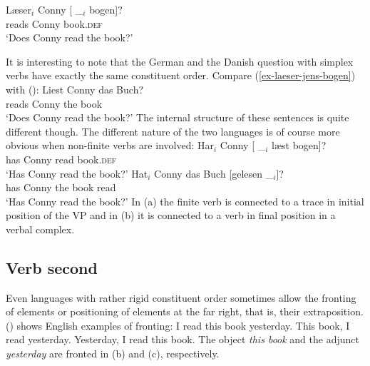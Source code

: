 \ex
\gll Læser$_i$ Conny [ \_$_i$ bogen]?\\
     reads     Conny {}        {}     book.\textsc{def}\\
\glt `Does Conny read the book?'
\zl

It is interesting to note that the German and the Danish question with simplex verbs have exactly
the same constituent order. Compare (\ref{ex-laeser-jens-bogen}) with ():
\ea
\gll Liest Conny das Buch?\\
     reads Conny the book\\ 
\glt `Does Conny read the book?'
\z
The internal structure of these sentences is quite different though. The different nature of the two
languages is of course more obvious when non-finite verbs are involved:
\eal
\ex
\gll Har$_i$ Conny [ \_$_i$ læst bogen]?\\
     has Conny {} {} read book.\textsc{def}\\
\glt `Has Conny read the book?'
\ex
\gll Hat$_i$ Conny das Buch [gelesen \_$_i$]?\\
     has Conny the book \spacebr{}read\\ 
\glt `Has Conny read the book?'
\zl
In (a) the finite verb is connected to a trace in initial position of the VP and in
(b) it is connected to a verb in final position in a verbal complex.


\subsection{Verb second}
\label{sce-verb-second}

Even languages with rather rigid constituent order sometimes allow the fronting of elements or
positioning of elements at the far right, that is, their extraposition. () shows English examples of fronting:
\eal
\ex I read this book yesterday.
\ex This book, I read yesterday.
\ex Yesterday, I read this book.
\zl
The object \emph{this book} and the adjunct \emph{yesterday} are fronted in (b) and
(c), respectively.

